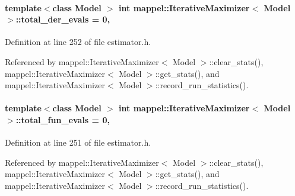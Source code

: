 \paragraph[{\texorpdfstring{total\+\_\+der\+\_\+evals}{total_der_evals}}]{\setlength{\rightskip}{0pt plus 5cm}template$<$class Model $>$ int {\bf mappel\+::\+Iterative\+Maximizer}$<$ Model $>$\+::total\+\_\+der\+\_\+evals = 0\hspace{0.3cm}{\ttfamily [protected]}, {\ttfamily [inherited]}}\hypertarget{classmappel_1_1IterativeMaximizer_a76de3653a5f2c200ad6865372eb9c154}{}\label{classmappel_1_1IterativeMaximizer_a76de3653a5f2c200ad6865372eb9c154}


Definition at line 252 of file estimator.\+h.



Referenced by mappel\+::\+Iterative\+Maximizer$<$ Model $>$\+::clear\+\_\+stats(), mappel\+::\+Iterative\+Maximizer$<$ Model $>$\+::get\+\_\+stats(), and mappel\+::\+Iterative\+Maximizer$<$ Model $>$\+::record\+\_\+run\+\_\+statistics().

\paragraph[{\texorpdfstring{total\+\_\+fun\+\_\+evals}{total_fun_evals}}]{\setlength{\rightskip}{0pt plus 5cm}template$<$class Model $>$ int {\bf mappel\+::\+Iterative\+Maximizer}$<$ Model $>$\+::total\+\_\+fun\+\_\+evals = 0\hspace{0.3cm}{\ttfamily [protected]}, {\ttfamily [inherited]}}\hypertarget{classmappel_1_1IterativeMaximizer_afbb76db27b845efa8e958611dd3c8d3c}{}\label{classmappel_1_1IterativeMaximizer_afbb76db27b845efa8e958611dd3c8d3c}


Definition at line 251 of file estimator.\+h.



Referenced by mappel\+::\+Iterative\+Maximizer$<$ Model $>$\+::clear\+\_\+stats(), mappel\+::\+Iterative\+Maximizer$<$ Model $>$\+::get\+\_\+stats(), and mappel\+::\+Iterative\+Maximizer$<$ Model $>$\+::record\+\_\+run\+\_\+statistics().

